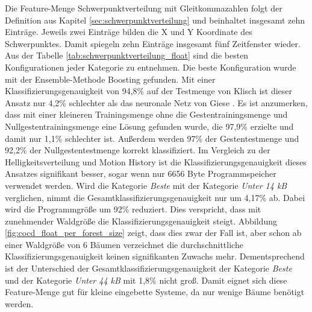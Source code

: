 Die Feature-Menge Schwerpunktverteilung mit Gleitkommazahlen folgt der Definition aus Kapitel \ref{sec:schwerpunktverteilung} und beinhaltet insgesamt zehn Einträge. Jeweils zwei Einträge bilden die X und Y
Koordinate des Schwerpunktes. Damit spiegeln zehn Einträge insgesamt fünf Zeitfenster wieder.
\newline
\newline
Aus der Tabelle \ref{tab:schwerpunktverteilung_float} sind die besten Konfigurationen jeder Kategorie zu entnehmen. Die beste Konfiguration wurde mit der Ensemble-Methode Boosting gefunden.
Mit einer Klassifizierungsgenauigkeit von 94,8\% auf der Testmenge von Klisch ist dieser Ansatz nur 4,2\% schlechter als das neuronale Netz von Giese \cite{gieseThesis}. Es ist anzumerken, dass mit einer
kleineren Trainingsmenge ohne die Gestentrainingsmenge und Nullgestentrainingsmenge eine Lösung gefunden wurde, die 97,9\% erzielte und damit nur 1,1\% schlechter ist.
Außerdem werden 97\% der Gestentestmenge und 92,2\% der Nullgestentestmenge korrekt klassifiziert.
\newline
\newline
Im Vergleich zu der Helligkeitsverteilung und Motion History ist die Klassifizierungsgenauigkeit dieses Ansatzes signifikant besser, sogar wenn nur 6656 Byte Programmspeicher verwendet werden.
Wird die Kategorie \textit{Beste} mit der Kategorie \textit{Unter 14 kB} verglichen, nimmt die Gesamtklassifizierungsgenauigkeit nur um 4,17\% ab. Dabei wird die Programmgröße um 92\% reduziert.
Dies verspricht, dass mit zunehmender Waldgröße die Klassifizierungsgenauigkeit steigt. Abbildung \ref{fig:cocd_float_per_forest_size} zeigt, dass dies zwar der Fall ist, aber schon ab einer Waldgröße von 6
Bäumen verzeichnet die durchschnittliche Klassifizierungsgenauigkeit keinen signifikanten Zuwachs mehr. Dementsprechend ist der Unterschied der Gesamtklassifizierungsgenauigkeit der Kategorie \textit{Beste}
und der Kategorie \textit{Unter 44 kB} mit 1,8\% nicht groß. Damit eignet sich diese Feature-Menge gut für kleine eingebette Systeme, da nur wenige Bäume benötigt werden.